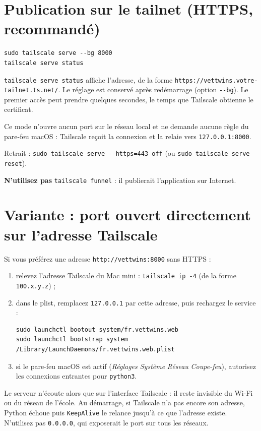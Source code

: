 \documentclass[11pt,a4paper]{article}
\newcommand{\cmd}[1]{\texttt{#1}}
\newcommand{\aremplacer}[1]{\textcolor{red!60!black}{\texttt{#1}}}
\begin{document}
\section{Publication sur le tailnet (HTTPS, recommandé)}
\begin{Verbatim}
sudo tailscale serve --bg 8000
tailscale serve status
\end{Verbatim}
\cmd{tailscale serve status} affiche l'adresse, de la forme
\cmd{https://vettwins.\aremplacer{votre-tailnet}.ts.net/}. Le réglage est conservé après redémarrage (option \cmd{-{}-bg}). Le premier accès peut prendre quelques secondes, le temps que Tailscale obtienne le certificat.

Ce mode n'ouvre aucun port sur le réseau local et ne demande aucune règle du pare-feu macOS : Tailscale reçoit la connexion et la relaie vers \cmd{127.0.0.1:8000}.

Retrait : \cmd{sudo tailscale serve -{}-https=443 off} (ou \cmd{sudo tailscale serve reset}).

\textbf{N'utilisez pas} \cmd{tailscale funnel} : il publierait l'application sur Internet.

\section{Variante : port ouvert directement sur l'adresse Tailscale}\label{sec:portdirect}
Si vous préférez une adresse \cmd{http://vettwins:8000} sans HTTPS :
\begin{enumerate}
  \item relevez l'adresse Tailscale du Mac mini : \cmd{tailscale ip -4} (de la forme \cmd{100.x.y.z}) ;
  \item dans le plist, remplacez \cmd{127.0.0.1} par cette adresse, puis rechargez le service :
\begin{Verbatim}
sudo launchctl bootout system/fr.vettwins.web
sudo launchctl bootstrap system /Library/LaunchDaemons/fr.vettwins.web.plist
\end{Verbatim}
  \item si le pare-feu macOS est actif (\emph{Réglages Système} \textrightarrow{} \emph{Réseau} \textrightarrow{} \emph{Coupe-feu}), autorisez les connexions entrantes pour \cmd{python3}.
\end{enumerate}
Le serveur n'écoute alors que sur l'interface Tailscale : il reste invisible du Wi-Fi ou du réseau de l'école. Au démarrage, si Tailscale n'a pas encore son adresse, Python échoue puis \cmd{KeepAlive} le relance jusqu'à ce que l'adresse existe. N'utilisez pas \cmd{0.0.0.0}, qui exposerait le port sur tous les réseaux.
\end{document}
